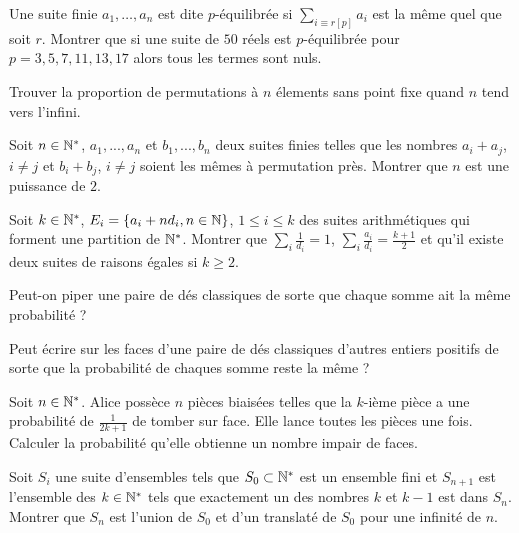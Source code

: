 \begin{exo}
Une suite finie $a_1, \dots, a_n$ est dite $p$-équilibrée si $\sum_{i\equiv r[p]}a_i$ est la même quel que soit $r$. Montrer que si une suite de $50$ réels est $p$-équilibrée pour $p=3,5,7,11,13,17$ alors tous les termes sont nuls.
\end{exo}


\begin{exo}
Trouver la proportion de permutations à $n$ élements sans point fixe quand $n$ tend vers l'infini.
\end{exo}


\begin{exo}
Soit $n\in\mathbb N^*$, $a_1,...,a_n$ et $b_1,...,b_n$ deux suites finies telles que les nombres $a_i+a_j$, $i\neq j$ et $b_i+b_j$, $i\neq j$ soient les mêmes à permutation près. Montrer que $n$ est une puissance de $2$.
\end{exo}


\begin{exo}
Soit $k\in\mathbb N^*$, $E_i=\{a_i+nd_i, n\in\mathbb N\}$, $1\leq i\leq k$ des suites arithmétiques qui forment une partition de $\mathbb N^*$. Montrer que $\sum_{i}\frac{1}{d_i}=1$, $\sum_{i}\frac{a_i}{d_i}=\frac{k+1}{2}$ et qu'il existe deux suites de raisons égales si $k\geq 2$.
\end{exo}


\begin{exo}
Peut-on piper une paire de dés classiques de sorte que chaque somme ait la même probabilité ?
\end{exo}


\begin{exo}
Peut écrire sur les faces d'une paire de dés classiques d'autres entiers positifs de sorte que la probabilité de chaques somme reste la même ?
\end{exo}


\begin{exo}
Soit $n\in\mathbb N^*$. Alice possèce $n$ pièces biaisées telles que la $k$-ième pièce a une probabilité de $\frac{1}{2k+1}$ de tomber sur face. Elle lance toutes les pièces une fois. Calculer la probabilité qu'elle obtienne un nombre impair de faces.
\end{exo}


\begin{exo}
Soit $S_i$ une suite d'ensembles tels que $S_0\subset\mathbb N^*$ est un ensemble fini et $S_{n+1}$ est l'ensemble des $k\in\mathbb N^*$ tels que exactement un des nombres $k$ et $k-1$ est dans $S_n$. Montrer que $S_n$ est l'union de $S_0$ et d'un translaté de $S_0$ pour une infinité de $n$.
\end{exo}


